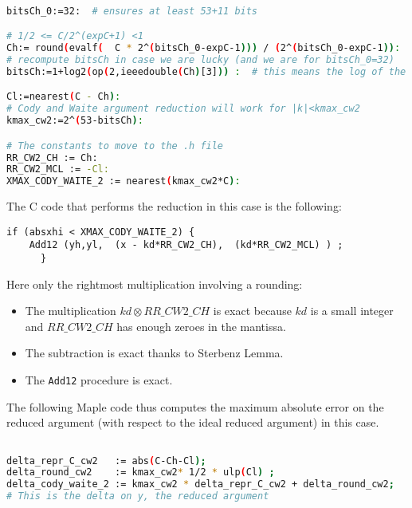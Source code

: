 \begin{lstlisting}[caption={Computing constants for Cody and Waite 2},
  firstnumber=1,  language={sh}]% of course it's maple
%Skip a line here, I don't know why, otherwise latex eats the first line

bitsCh_0:=32:  # ensures at least 53+11 bits

# 1/2 <= C/2^(expC+1) <1
Ch:= round(evalf(  C * 2^(bitsCh_0-expC-1))) / (2^(bitsCh_0-expC-1)):
# recompute bitsCh in case we are lucky (and we are for bitsCh_0=32)
bitsCh:=1+log2(op(2,ieeedouble(Ch)[3])) :  # this means the log of the denominator

Cl:=nearest(C - Ch):
# Cody and Waite argument reduction will work for |k|<kmax_cw2
kmax_cw2:=2^(53-bitsCh):

# The constants to move to the .h file
RR_CW2_CH := Ch:
RR_CW2_MCL := -Cl:
XMAX_CODY_WAITE_2 := nearest(kmax_cw2*C):
\end{lstlisting}

The C code that performs the reduction in this case is the following:

\begin{lstlisting}[caption={Cody and Waite argument reduction with two
    constants},firstnumber=1]
      if (absxhi < XMAX_CODY_WAITE_2) { 
	Add12 (yh,yl,  (x - kd*RR_CW2_CH),  (kd*RR_CW2_MCL) ) ;
      }
\end{lstlisting}

Here only the rightmost multiplication involving a rounding: 
\begin{itemize}
\item The multiplication $\mathit{kd}\otimes \mathit{RR\_CW2\_CH}$ is
  exact because $kd$ is a small integer and $\mathit{RR\_CW2\_CH}$
  has enough zeroes in the mantissa.
\item The subtraction is exact thanks to Sterbenz Lemma.
\item The \texttt{Add12} procedure is exact.
\end{itemize}

The following Maple code thus computes the maximum absolute error on
the reduced argument (with respect to the ideal reduced argument) in
this case.
\begin{lstlisting}[caption={Computing constants for Cody and Waite 2},
  firstnumber=1,  language={sh}]% of course it's maple

delta_repr_C_cw2   := abs(C-Ch-Cl);
delta_round_cw2    := kmax_cw2* 1/2 * ulp(Cl) ;
delta_cody_waite_2 := kmax_cw2 * delta_repr_C_cw2 + delta_round_cw2;
# This is the delta on y, the reduced argument
\end{lstlisting}


